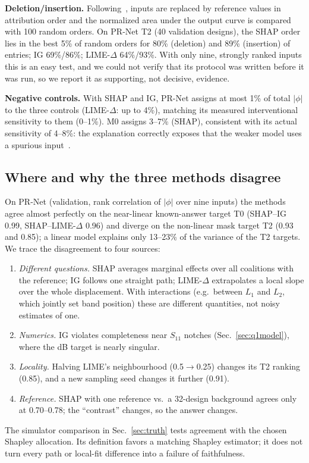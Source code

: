 \documentclass[conference,10pt]{IEEEtran}
\newcommand{\lime}{LIME-$\Delta$}
\begin{document}
\textbf{Deletion/insertion.} Following~\cite{petsiuk2018}, inputs are replaced by reference values in attribution order and the normalized area under the output curve is compared with 100 random orders.
On PR-Net T2 (40 validation designs), the SHAP order lies in the best 5\% of random orders for 80\% (deletion) and 89\% (insertion) of entries; IG 69\%/86\%; \lime{} 64\%/93\%.
With only nine, strongly ranked inputs this is an easy test, and we could not verify that its protocol was written before it was run, so we report it as supporting, not decisive, evidence.

\textbf{Negative controls.} With SHAP and IG, PR-Net assigns at most 1\% of total $|\phi|$ to the three controls (\lime: up to 4\%), matching its measured interventional sensitivity to them (0--1\%).
M0 assigns 3--7\% (SHAP), consistent with its actual sensitivity of 4--8\%: the explanation correctly exposes that the weaker model uses a spurious input~\cite{adebayo2018}.

\subsection{Where and why the three methods disagree}
\label{sec:disagree}
On PR-Net (validation, rank correlation of $|\phi|$ over nine inputs) the methods agree almost perfectly on the near-linear known-answer target T0 (SHAP--IG 0.99, SHAP--\lime{} 0.96) and diverge on the non-linear mask target T2 (0.93 and 0.85); a linear model explains only 13--23\% of the variance of the T2 targets.
We trace the disagreement to four sources:
\begin{enumerate}
\item \emph{Different questions.} SHAP averages marginal effects over all coalitions with the reference; IG follows one straight path; \lime{} extrapolates a local slope over the whole displacement. With interactions (e.g.\ between $L_1$ and $L_2$, which jointly set band position) these are different quantities, not noisy estimates of one.
\item \emph{Numerics.} IG violates completeness near $S_{11}$ notches (Sec.~\ref{sec:q1model}), where the dB target is nearly singular.
\item \emph{Locality.} Halving LIME's neighbourhood (0.5$\to$0.25) changes its T2 ranking (0.85), and a new sampling seed changes it further (0.91).
\item \emph{Reference.} SHAP with one reference vs.\ a 32-design background agrees only at 0.70--0.78; the ``contrast'' changes, so the answer changes.
\end{enumerate}
The simulator comparison in Sec.~\ref{sec:truth} tests agreement with the chosen Shapley allocation. Its definition favors a matching Shapley estimator; it does not turn every path or local-fit difference into a failure of faithfulness.
\end{document}
